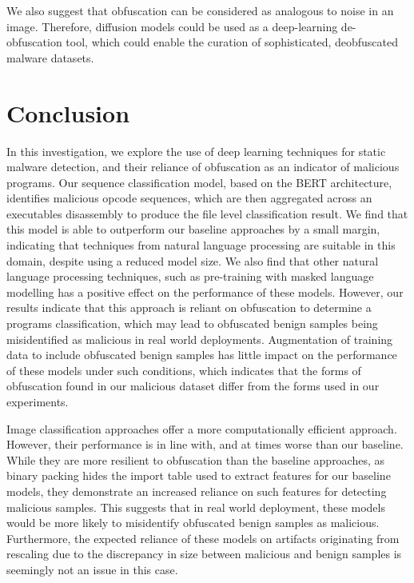 \documentclass[conference,compsoc]{IEEEtran}
\begin{document}
We also suggest that obfuscation can be considered as analogous to noise in an image. Therefore, diffusion models could be used as a deep-learning de-obfuscation tool, which could enable the curation of sophisticated, deobfuscated malware datasets. 

\section{Conclusion}

In this investigation, we explore the use of deep learning techniques for static malware detection, and their reliance of obfuscation as an indicator of malicious programs. Our sequence classification model, based on the BERT architecture, identifies malicious opcode sequences, which are then aggregated across an executables disassembly to produce the file level classification result. We find that this model is able to outperform our baseline approaches by a small margin, indicating that techniques from natural language processing are suitable in this domain, despite using a reduced model size. We also find that other natural language processing techniques, such as pre-training with masked language modelling has a positive effect on the performance of these models. However, our results indicate that this approach is reliant on obfuscation to determine a programs classification, which may lead to obfuscated benign samples being misidentified as malicious in real world deployments. Augmentation of training data to include obfuscated benign samples has little impact on the performance of these models under such conditions, which indicates that the forms of obfuscation found in our malicious dataset differ from the forms used in our experiments. 

Image classification approaches offer a more computationally efficient approach. However, their performance is in line with, and at times worse than our baseline. While they are more resilient to obfuscation than the baseline approaches, as binary packing hides the import table used to extract features for our baseline models, they demonstrate an increased reliance on such features for detecting malicious samples. This suggests that in real world deployment, these models would be more likely to misidentify obfuscated benign samples as malicious. Furthermore, the expected reliance of these models on artifacts originating from rescaling due to the discrepancy in size between malicious and benign samples is seemingly not an issue in this case. 
\end{document}
